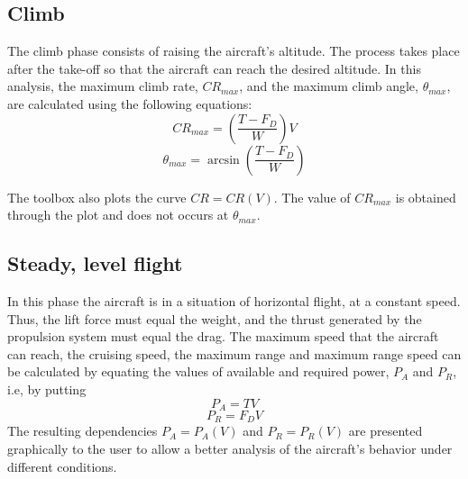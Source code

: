 \documentclass[10pt]{SelfArx} %
\begin{document}
\subsection{Climb}

The climb phase consists of raising the aircraft's altitude. The process takes place after the take-off so that the aircraft can reach the desired altitude. In this analysis, the maximum climb rate, ${C\!R}_ {max}$, and the maximum climb angle, $\theta_ {max}$, are calculated using the following equations: 
\begin{equation} \label{eq:RC}
C\!R_ {max}=\left(\frac{T-F_D }{ W}\right)V
\end{equation}
\begin{equation} \label{eq:phiRC}
\theta_{max}=\arcsin\left(\frac{T-F_D }{ W}\right)
\end{equation}

The toolbox also plots the curve ${C\!R}={C\!R}(V)$. The value of ${C\!R}_ {max}$ is obtained through the plot  and does not occurs at $\theta_{max}$.

\subsection{Steady, level flight}
In this phase the aircraft is in a situation of horizontal flight, at a constant speed. Thus, the lift force must equal the weight, and the thrust generated by the propulsion system must equal  the drag. The maximum speed that the aircraft can reach, the cruising speed, the maximum range and maximum range speed can  be calculated by equating the values of available and required power,  $P_A$ and $P_R$, i.e, by putting 
\begin{equation} \label{eq:power}
P_A = {TV}
\end{equation}
\begin{equation} \label{eq:power}
P_R = {F_D V}
\end{equation}
The resulting dependencies $P_A = P_A (V)$ and $P_R = P_R (V)$ are presented graphically to the user to allow a better analysis of the aircraft's behavior under different conditions.

\end{document}
